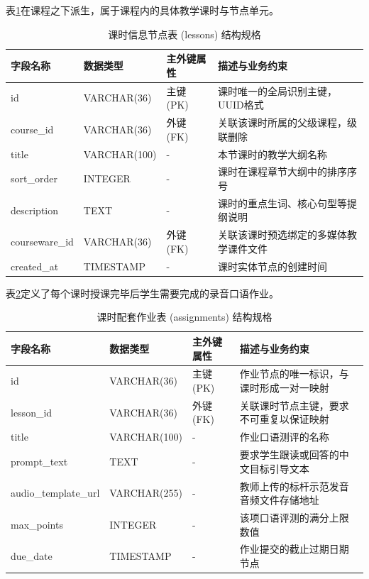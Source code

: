 表\ref{tab:db-lessons}在课程之下派生，属于课程内的具体教学课时与节点单元。

\begin{table}[H]
\centering
\caption{课时信息节点表 (lessons) 结构规格}
\label{tab:db-lessons}
\begin{tabularx}{\textwidth}{lllX}
\toprule
字段名称 & 数据类型 & 主外键属性 & 描述与业务约束 \\
\midrule
id & VARCHAR(36) & 主键 (PK) & 课时唯一的全局识别主键，UUID格式 \\
course\_id & VARCHAR(36) & 外键 (FK) & 关联该课时所属的父级课程，级联删除 \\
title & VARCHAR(100) & - & 本节课时的教学大纲名称 \\
sort\_order & INTEGER & - & 课时在课程章节大纲中的排序序号 \\
description & TEXT & - & 课时的重点生词、核心句型等提纲说明 \\
courseware\_id & VARCHAR(36) & 外键 (FK) & 关联该课时预选绑定的多媒体教学课件文件 \\
created\_at & TIMESTAMP & - & 课时实体节点的创建时间 \\
\bottomrule
\end{tabularx}
\end{table}

表\ref{tab:db-assignments}定义了每个课时授课完毕后学生需要完成的录音口语作业。

\begin{table}[H]
\centering
\caption{课时配套作业表 (assignments) 结构规格}
\label{tab:db-assignments}
\begin{tabularx}{\textwidth}{lllX}
\toprule
字段名称 & 数据类型 & 主外键属性 & 描述与业务约束 \\
\midrule
id & VARCHAR(36) & 主键 (PK) & 作业节点的唯一标识，与课时形成一对一映射 \\
lesson\_id & VARCHAR(36) & 外键 (FK) & 关联课时节点主键，要求不可重复以保证映射 \\
title & VARCHAR(100) & - & 作业口语测评的名称 \\
prompt\_text & TEXT & - & 要求学生跟读或回答的中文目标引导文本 \\
audio\_template\_url & VARCHAR(255) & - & 教师上传的标杆示范发音音频文件存储地址 \\
max\_points & INTEGER & - & 该项口语评测的满分上限数值 \\
due\_date & TIMESTAMP & - & 作业提交的截止过期日期节点 \\
\bottomrule
\end{tabularx}
\end{table}

